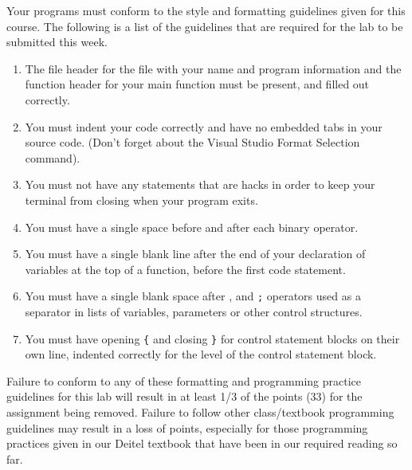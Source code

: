 \documentclass[11pt]{article}
\begin{document}
Your programs must conform to the style and formatting guidelines given for this course.
The following is a list of the guidelines that are required for the lab to be submitted
this week.

\begin{enumerate}
\item The file header for the file with your name and program information
and the function header for your main function must be present, and
filled out correctly.
\item You must indent your code correctly and have no embedded tabs in
your source code. (Don't forget about the Visual Studio Format
Selection command).
\item You must not have any statements that are hacks in order to keep
your terminal from closing when your program exits.
\item You must have a single space before and after each binary operator.
\item You must have a single blank line after the end of your declaration
of variables at the top of a function, before the first code
statement.
\item You must have a single blank space after , and \verb~;~ operators used as a
separator in lists of variables, parameters or other control
structures.
\item You must have opening \verb~{~ and closing \verb~}~ for control statement blocks
on their own line, indented correctly for the level of the control
statement block.
\end{enumerate}

Failure to conform to any of these formatting and programming practice
guidelines for this lab will result in at least 1/3 of the points (33)
for the assignment being removed.  Failure to follow other
class/textbook programming guidelines may result in a loss of points,
especially for those programming practices given in our Deitel
textbook that have been in our required reading so far.
\end{document}
